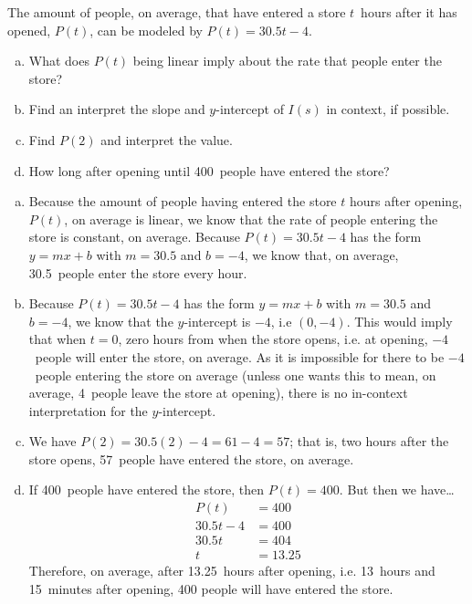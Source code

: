 \documentclass[11pt,letterpaper]{article}
\begin{document}
\newpage



 The amount of people, on average, that have entered a store $t$~hours after it has opened, $P(t)$, can be modeled by $P(t)= 30.5t - 4$. 
	\begin{enumerate}[(a)]
	\item What does $P(t)$ being linear imply about the rate that people enter the store?
	\item Find an interpret the slope and $y$-intercept of $I(s)$ in context, if possible.
	\item Find $P(2)$ and interpret the value. 
	\item How long after opening until 400~people have entered the store? 
	\end{enumerate} \pspace

\sol
\begin{enumerate}[(a)]
\item Because the amount of people having entered the store $t$ hours after opening, $P(t)$, on average is linear, we know that the rate of people entering the store is constant, on average. Because $P(t)= 30.5t - 4$ has the form $y= mx + b$ with $m= 30.5$ and $b= -4$, we know that, on average, 30.5~people enter the store every hour. 

\item Because $P(t)= 30.5t - 4$ has the form $y= mx + b$ with $m= 30.5$ and $b= -4$, we know that the $y$-intercept is $-4$, i.e $(0, -4)$. This would imply that when $t= 0$, zero hours from when the store opens, i.e. at opening, $-4$~people will enter the store, on average. As it is impossible for there to be $-4$~people entering the store on average (unless one wants this to mean, on average, 4~people leave the store at opening), there is no in-context interpretation for the $y$-intercept. 

\item We have $P(2)= 30.5(2) - 4= 61 - 4= 57$; that is, two hours after the store opens, 57~people have entered the store, on average. 

\item If 400~people have entered the store, then $P(t)= 400$. But then we have\dots
	\[
	\begin{aligned}
	P(t)&= 400 \\[0.3cm]
	30.5t - 4&= 400 \\[0.3cm]
	30.5t&= 404 \\[0.3cm]
	t&= 13.25
	\end{aligned}
	\]
Therefore, on average, after 13.25~hours after opening, i.e. 13~hours and 15~minutes after opening, 400 people will have entered the store. 
\end{enumerate}
\end{document}
